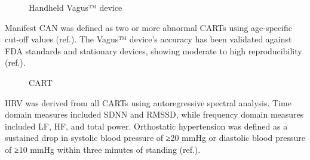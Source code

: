\documentclass[
  a4paper,
  headsepline=true,
  open=any]{scrbook}
\begin{document}
\begin{figure}

\begin{minipage}[t]{\linewidth}

{\centering 


\caption{Handheld Vagus™ device}

}

\end{minipage}%

\end{figure}

Manifest CAN was defined as two or more abnormal CARTs using
age-specific cut-off values (ref.). The Vagus™ device's accuracy has
been validated against FDA standards and stationary devices, showing
moderate to high reproducibility (ref.).

\begin{figure}

\begin{minipage}[t]{\linewidth}

{\centering 


\caption{CART}

}

\end{minipage}%

\end{figure}

HRV was derived from all CARTs using autoregressive spectral analysis.
Time domain measures included SDNN and RMSSD, while frequency domain
measures included LF, HF, and total power. Orthostatic hypertension was
defined as a sustained drop in systolic blood pressure of ≥20 mmHg or
diastolic blood pressure of ≥10 mmHg within three minutes of standing
(ref.).
\end{document}
